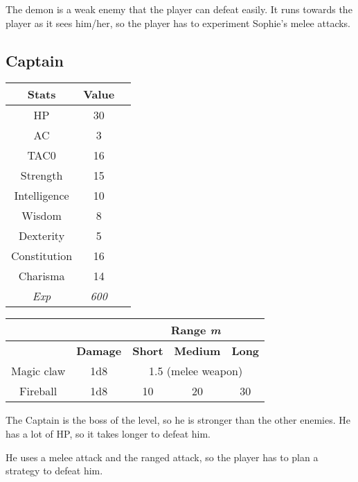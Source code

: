 The demon is a weak enemy that the player can defeat easily. It runs towards the player as it sees him/her, so the player has to experiment Sophie's melee attacks.

\subsection{Captain}
\begin{table}[H]
  \centering
\begin{tabular}{|c|c|c|}
\hline
\rowcolor[HTML]{C0C0C0}
\textbf{Stats} & \textbf{Value } \\ \hline
HP & 30  \\ \hline
AC & 3 \\ \hline
TAC0 & 16 \\ \hline
Strength & 15  \\ \hline
Intelligence & 10 \\ \hline
Wisdom & 8 \\ \hline
Dexterity & 5  \\ \hline
Constitution & 16 \\ \hline
Charisma & 14 \\ \hline
\textit{Exp} & \textit{600} \\ \hline
\end{tabular}
\end{table}
\begin{table}[H]
\centering
\begin{tabular}{ll|c|c|c|}
\cline{3-5}
 &  & \multicolumn{3}{c|}{\cellcolor[HTML]{C0C0C0}\textbf{Range \textit{m}}} \\ \hline
\rowcolor[HTML]{C0C0C0}
\multicolumn{1}{|l|}{\cellcolor[HTML]{C0C0C0}\textbf{Weapon}} & \textbf{Damage} &\multicolumn{1}{l|}{\cellcolor[HTML]{C0C0C0}\textbf{Short}} & \textbf{Medium} & \textbf{Long} \\ \hline
\multicolumn{1}{|c|}{Magic claw} & \multicolumn{1}{c|}{1d8} & \multicolumn{3}{c|}{1.5 (melee weapon)} \\ \hline
\multicolumn{1}{|c|}{Fireball} & \multicolumn{1}{c|}{1d8} & 10 & 20 & 30 \\ \hline
\end{tabular}
\end{table}

The Captain is the boss of the level, so he is stronger than the other enemies. He has a lot of HP, so it takes longer to defeat him.

He uses a melee attack and the ranged attack, so the player has to plan a strategy to defeat him.
